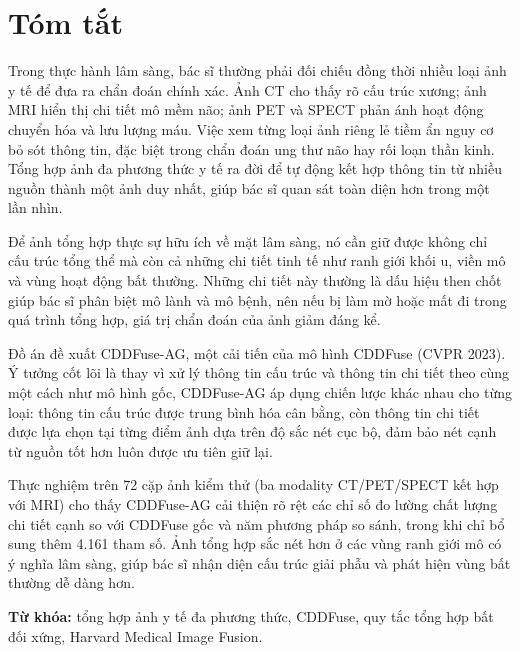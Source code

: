 \chapter*{Tóm tắt}

Trong thực hành lâm sàng, bác sĩ thường phải đối chiếu đồng thời nhiều loại ảnh y tế để đưa ra chẩn đoán chính xác. Ảnh CT cho thấy rõ cấu trúc xương; ảnh MRI hiển thị chi tiết mô mềm não; ảnh PET và SPECT phản ánh hoạt động chuyển hóa và lưu lượng máu. Việc xem từng loại ảnh riêng lẻ tiềm ẩn nguy cơ bỏ sót thông tin, đặc biệt trong chẩn đoán ung thư não hay rối loạn thần kinh. Tổng hợp ảnh đa phương thức y tế ra đời để tự động kết hợp thông tin từ nhiều nguồn thành một ảnh duy nhất, giúp bác sĩ quan sát toàn diện hơn trong một lần nhìn.

Để ảnh tổng hợp thực sự hữu ích về mặt lâm sàng, nó cần giữ được không chỉ cấu trúc tổng thể mà còn cả những chi tiết tinh tế như ranh giới khối u, viền mô và vùng hoạt động bất thường. Những chi tiết này thường là dấu hiệu then chốt giúp bác sĩ phân biệt mô lành và mô bệnh, nên nếu bị làm mờ hoặc mất đi trong quá trình tổng hợp, giá trị chẩn đoán của ảnh giảm đáng kể.

Đồ án đề xuất CDDFuse-AG, một cải tiến của mô hình CDDFuse (CVPR 2023). Ý tưởng cốt lõi là thay vì xử lý thông tin cấu trúc và thông tin chi tiết theo cùng một cách như mô hình gốc, CDDFuse-AG áp dụng chiến lược khác nhau cho từng loại: thông tin cấu trúc được trung bình hóa cân bằng, còn thông tin chi tiết được lựa chọn tại từng điểm ảnh dựa trên độ sắc nét cục bộ, đảm bảo nét cạnh từ nguồn tốt hơn luôn được ưu tiên giữ lại.

Thực nghiệm trên 72 cặp ảnh kiểm thử (ba modality CT/PET/SPECT kết hợp với MRI) cho thấy CDDFuse-AG cải thiện rõ rệt các chỉ số đo lường chất lượng chi tiết cạnh so với CDDFuse gốc và năm phương pháp so sánh, trong khi chỉ bổ sung thêm 4.161 tham số. Ảnh tổng hợp sắc nét hơn ở các vùng ranh giới mô có ý nghĩa lâm sàng, giúp bác sĩ nhận diện cấu trúc giải phẫu và phát hiện vùng bất thường dễ dàng hơn.

\bigskip
\noindent\textbf{Từ khóa:} tổng hợp ảnh y tế đa phương thức, CDDFuse, quy tắc tổng hợp bất đối xứng, Harvard Medical Image Fusion.
